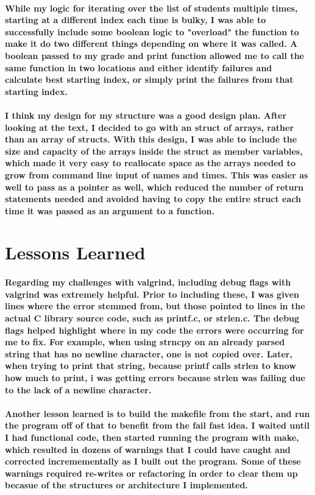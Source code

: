 \documentclass{report}
\begin{document}
\paragraph{While my logic for iterating over the list of students multiple times, starting at a different
index each time is bulky, I was able to successfully include some boolean logic to "overload" the
function to make it do two different things depending on where it was called. A boolean passed to my grade and print 
function allowed me to call the same function in two locations and either identify failures and 
calculate best starting index, or simply print the failures from that starting index.}
\paragraph{I think my design for my structure was a good design plan. After looking at the text, I decided
to go with an struct of arrays, rather than an array of structs. With this design, I was able to
include the size and capacity of the arrays inside the struct as member variables, which made it
very easy to reallocate space as the arrays needed to grow from command line input of names and times.
This was easier as well to pass as a pointer as well, which reduced the number of return statements needed
and avoided having to copy the entire struct each time it was passed as an argument to a function.}

\section{Lessons Learned}
\paragraph{Regarding my challenges with valgrind, including debug flags with valgrind was extremely helpful.
Prior to including these, I was given lines where the error stemmed from, but those pointed to lines
in the actual C library source code, such as printf.c, or strlen.c. The debug flags helped highlight where
in my code the errors were occurring for me to fix. For example, when using strncpy on an already parsed string
that has no newline character, one is not copied over. Later, when trying to print that string, because
printf calls strlen to know how much to print, i was getting errors because strlen was failing due to
the lack of a newline character.}
\paragraph{Another lesson learned is to build the makefile from the start, and run the program off of that
to benefit from the fail fast idea. I waited until I had functional code, then started running the
program with make, which resulted in dozens of warnings that I could have caught and corrected
incremementally as I built out the program. Some of these warnings required re-writes or refactoring
in order to clear them up becasue of the structures or architecture I implemented.}
\end{document}
